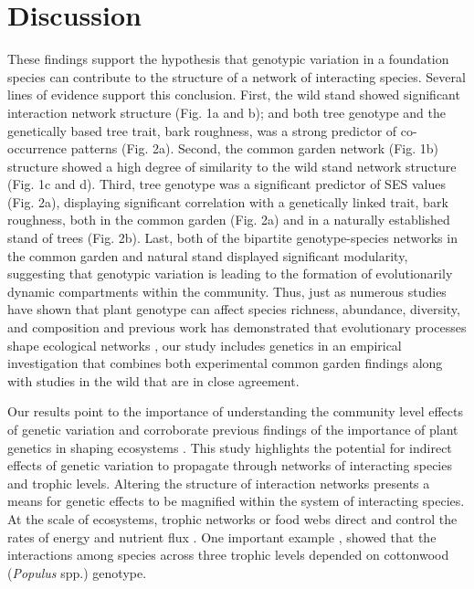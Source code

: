 \documentclass[fleqn,10pt]{wlscirep}
\begin{document}
\section*{Discussion}


These findings support the hypothesis that genotypic variation in a
foundation species can contribute to the structure of a network of
interacting species. Several lines of evidence support this
conclusion. First, the wild stand showed significant interaction
network structure (Fig. 1a and b); and both tree genotype and the
genetically based tree trait, bark roughness, was a strong predictor
of co-occurrence patterns (Fig. 2a). Second, the common garden network
(Fig. 1b) structure showed a high degree of similarity to the wild
stand network structure (Fig. 1c and d). Third, tree genotype was a
significant predictor of SES values (Fig. 2a), displaying significant
correlation with a genetically linked trait, bark roughness, both in
the common garden (Fig. 2a) and in a naturally established stand of
trees (Fig. 2b). Last, both of the bipartite genotype-species networks
in the common garden and natural stand displayed significant
modularity, suggesting that genotypic variation is leading to the
formation of evolutionarily dynamic compartments within the
community. Thus, just as numerous studies have shown that plant
genotype can affect species richness, abundance, diversity, and
composition and previous work has demonstrated that evolutionary
processes shape ecological networks \cite{Guimaraes2011,
  Moya-Larano2011}, our study includes genetics in an empirical
investigation that combines both experimental common garden findings
along with studies in the wild that are in close agreement.

Our results point to the importance of understanding the community
level effects of genetic variation and corroborate previous findings
of the importance of plant genetics in shaping ecosystems
\cite{Whitham2006a}.  This study highlights the potential for indirect
effects of genetic variation to propagate through networks of
interacting species and trophic levels. Altering the structure of
interaction networks presents a means for genetic effects to be
magnified within the system of interacting species. At the scale of
ecosystems, trophic networks or food webs direct and control the rates
of energy and nutrient flux \cite{Borgatti2006}. One important example
\cite{Smith2011}, showed that the interactions among species across
three trophic levels depended on cottonwood (\textit{Populus} spp.)
genotype. 
\end{document}
